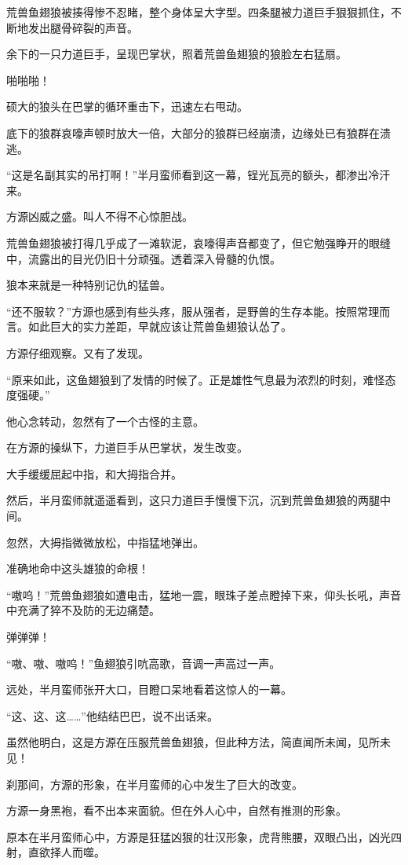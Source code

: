 \begin{this_body}
荒兽鱼翅狼被揍得惨不忍睹，整个身体呈大字型。四条腿被力道巨手狠狠抓住，不断地发出腿骨碎裂的声音。

余下的一只力道巨手，呈现巴掌状，照着荒兽鱼翅狼的狼脸左右猛扇。

啪啪啪！

硕大的狼头在巴掌的循环重击下，迅速左右甩动。

底下的狼群哀嚎声顿时放大一倍，大部分的狼群已经崩溃，边缘处已有狼群在溃逃。

“这是名副其实的吊打啊！”半月蛮师看到这一幕，锃光瓦亮的额头，都渗出冷汗来。

方源凶威之盛。叫人不得不心惊胆战。

荒兽鱼翅狼被打得几乎成了一滩软泥，哀嚎得声音都变了，但它勉强睁开的眼缝中，流露出的目光仍旧十分顽强。透着深入骨髓的仇恨。

狼本来就是一种特别记仇的猛兽。

“还不服软？”方源也感到有些头疼，服从强者，是野兽的生存本能。按照常理而言。如此巨大的实力差距，早就应该让荒兽鱼翅狼认怂了。

方源仔细观察。又有了发现。

“原来如此，这鱼翅狼到了发情的时候了。正是雄性气息最为浓烈的时刻，难怪态度强硬。”

他心念转动，忽然有了一个古怪的主意。

在方源的操纵下，力道巨手从巴掌状，发生改变。

大手缓缓屈起中指，和大拇指合并。

然后，半月蛮师就遥遥看到，这只力道巨手慢慢下沉，沉到荒兽鱼翅狼的两腿中间。

忽然，大拇指微微放松，中指猛地弹出。

准确地命中这头雄狼的命根！

“嗷呜！”荒兽鱼翅狼如遭电击，猛地一震，眼珠子差点瞪掉下来，仰头长吼，声音中充满了猝不及防的无边痛楚。

弹弹弹！

“嗷、嗷、嗷呜！”鱼翅狼引吭高歌，音调一声高过一声。

远处，半月蛮师张开大口，目瞪口呆地看着这惊人的一幕。

“这、这、这……”他结结巴巴，说不出话来。

虽然他明白，这是方源在压服荒兽鱼翅狼，但此种方法，简直闻所未闻，见所未见！

刹那间，方源的形象，在半月蛮师的心中发生了巨大的改变。

方源一身黑袍，看不出本来面貌。但在外人心中，自然有推测的形象。

原本在半月蛮师心中，方源是狂猛凶狠的壮汉形象，虎背熊腰，双眼凸出，凶光四射，直欲择人而噬。


\end{this_body}
